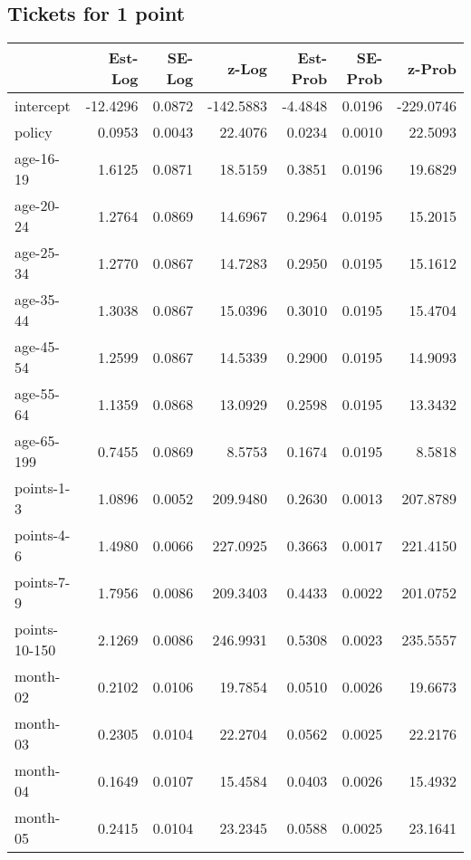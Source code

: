 \documentclass[10pt]{article}
\begin{document}
\subsection{Tickets for 1 point}




\begin{table}[ht]
\centering
\begin{tabular}{lrrrrrr}
  \hline
 & Est-Log & SE-Log & z-Log & Est-Prob & SE-Prob & z-Prob \\ 
  \hline
intercept & -12.4296 & 0.0872 & -142.5883 & -4.4848 & 0.0196 & -229.0746 \\ 
  policy & 0.0953 & 0.0043 & 22.4076 & 0.0234 & 0.0010 & 22.5093 \\ 
  age-16-19 & 1.6125 & 0.0871 & 18.5159 & 0.3851 & 0.0196 & 19.6829 \\ 
  age-20-24 & 1.2764 & 0.0869 & 14.6967 & 0.2964 & 0.0195 & 15.2015 \\ 
  age-25-34 & 1.2770 & 0.0867 & 14.7283 & 0.2950 & 0.0195 & 15.1612 \\ 
  age-35-44 & 1.3038 & 0.0867 & 15.0396 & 0.3010 & 0.0195 & 15.4704 \\ 
  age-45-54 & 1.2599 & 0.0867 & 14.5339 & 0.2900 & 0.0195 & 14.9093 \\ 
  age-55-64 & 1.1359 & 0.0868 & 13.0929 & 0.2598 & 0.0195 & 13.3432 \\ 
  age-65-199 & 0.7455 & 0.0869 & 8.5753 & 0.1674 & 0.0195 & 8.5818 \\ 
  points-1-3 & 1.0896 & 0.0052 & 209.9480 & 0.2630 & 0.0013 & 207.8789 \\ 
  points-4-6 & 1.4980 & 0.0066 & 227.0925 & 0.3663 & 0.0017 & 221.4150 \\ 
  points-7-9 & 1.7956 & 0.0086 & 209.3403 & 0.4433 & 0.0022 & 201.0752 \\ 
  points-10-150 & 2.1269 & 0.0086 & 246.9931 & 0.5308 & 0.0023 & 235.5557 \\ 
  month-02 & 0.2102 & 0.0106 & 19.7854 & 0.0510 & 0.0026 & 19.6673 \\ 
  month-03 & 0.2305 & 0.0104 & 22.2704 & 0.0562 & 0.0025 & 22.2176 \\ 
  month-04 & 0.1649 & 0.0107 & 15.4584 & 0.0403 & 0.0026 & 15.4932 \\ 
  month-05 & 0.2415 & 0.0104 & 23.2345 & 0.0588 & 0.0025 & 23.1641 \\ 

\end{tabular}
\end{table}
\end{document}
